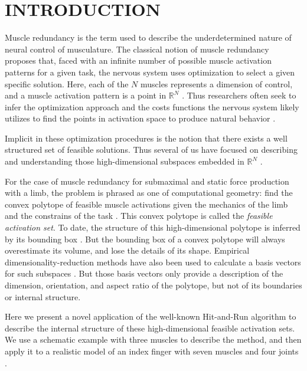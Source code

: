 
\section{INTRODUCTION}

Muscle redundancy is the term used to describe the underdetermined nature of neural control of musculature.
The classical notion of muscle redundancy  proposes that, faced with an infinite number of possible muscle activation patterns for a given task, the nervous system uses optimization to select a given specific solution.
Here, each of the $N$ muscles represents a dimension of control, and a muscle activation pattern is a point in $\mathbb{R}^N$ \cite{Valero-Cuevas1998Large}.
Thus researchers often seek to infer the optimization approach and the costs functions the nervous system likely utilizes to find the points in activation space to produce natural behavior \cite{Chao1978Graphical,Prilutsky2000Muscle,scott2004optimal,todorov2002optimal,crowninshield1981physiologically,higginson2005simulated}. 


Implicit in these optimization procedures is the notion that there exists a well structured set of feasible solutions. Thus several of us have focused on describing and understanding those high-dimensional subspaces  embedded in $\mathbb{R}^N$ \cite{kutch2011muscle,kutch2012challenges,sohn2013cat_bounding_box,Valero-Cuevas1998Large,Valero-Cuevas2015high-dimensional}.

For the case of muscle redundancy for submaximal and static force production with a limb,  the problem is phrased as one of computational geometry: find the convex polytope of feasible muscle activations given the mechanics of the limb and the constrains of the task \cite{avis1992Pivoting,Valero-Cuevas1998Large,Valero-Cuevas2009mathematical,Valero-Cuevas2015high-dimensional}.  This convex polytope is called the \emph{feasible activation set}. To date, the structure of this high-dimensional polytope is inferred by its bounding box  \cite{kutch2011muscle,sohn2013cat_bounding_box,Valero-Cuevas2015high-dimensional}.  But the bounding box of a convex polytope will always overestimate its volume, and lose the details of its shape.  Empirical dimensionality-reduction methods have also been used to calculate a basis vectors for such subspaces \cite{Clewley2008Estimating,davella2005shared,krishnamoorthy2003muscle}. But those basis  vectors only provide a description of the dimension, orientation, and aspect ratio of the polytope, but not of its boundaries or internal  structure.

Here we present a novel application of the well-known Hit-and-Run algorithm \cite{smith1984efficient} to describe the internal structure of these high-dimensional feasible activation sets. We use a schematic example with three muscles to describe the method, and then apply it to a realistic model of an index finger with seven muscles and four joints \cite{Valero-Cuevas1998Large}.